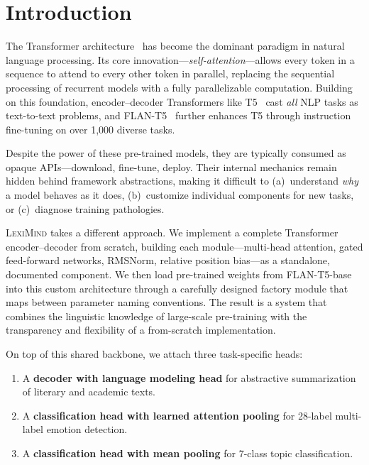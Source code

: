 \documentclass[11pt,a4paper]{article}
\newcommand{\lexiname}{\textsc{LexiMind}}
\newcommand{\tflant}{FLAN-T5}
\begin{document}
\section{Introduction}
\label{sec:intro}

The Transformer architecture~\citep{vaswani2017attention} has become the dominant paradigm in natural language processing.
Its core innovation---\emph{self-attention}---allows every token in a sequence to attend to every other token in parallel, replacing the sequential processing of recurrent models with a fully parallelizable computation.
Building on this foundation, encoder--decoder Transformers like T5~\citep{raffel2020exploring} cast \emph{all} NLP tasks as text-to-text problems, and \tflant{}~\citep{chung2022scaling} further enhances T5 through instruction fine-tuning on over 1,000 diverse tasks.

Despite the power of these pre-trained models, they are typically consumed as opaque APIs---download, fine-tune, deploy.
Their internal mechanics remain hidden behind framework abstractions, making it difficult to (a)~understand \emph{why} a model behaves as it does, (b)~customize individual components for new tasks, or (c)~diagnose training pathologies.

\lexiname{} takes a different approach.
We implement a complete Transformer encoder--decoder from scratch, building each module---multi-head attention, gated feed-forward networks, RMSNorm, relative position bias---as a standalone, documented component.
We then load pre-trained weights from \tflant{}-base into this custom architecture through a carefully designed factory module that maps between parameter naming conventions.
The result is a system that combines the linguistic knowledge of large-scale pre-training with the transparency and flexibility of a from-scratch implementation.

On top of this shared backbone, we attach three task-specific heads:
\begin{enumerate}[nosep]
    \item A \textbf{decoder with language modeling head} for abstractive summarization of literary and academic texts.
    \item A \textbf{classification head with learned attention pooling} for 28-label multi-label emotion detection.
    \item A \textbf{classification head with mean pooling} for 7-class topic classification.
\end{enumerate}
\end{document}
